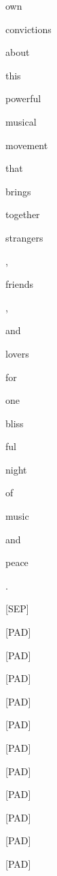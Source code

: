 \documentclass[varwidth=150mm]{standalone}
\begin{document}
\begin{CJK*}{UTF8}{gbsn}
{{{\colorbox{red!2.5239310264587402}{\strut own} \colorbox{red!10.412678718566895}{\strut convictions} \colorbox{red!2.299309730529785}{\strut about} \colorbox{red!8.074763298034668}{\strut this} \colorbox{red!3.294198513031006}{\strut powerful} \colorbox{red!11.1122407913208}{\strut musical} \colorbox{red!8.959418296813965}{\strut movement} \colorbox{red!4.8748297691345215}{\strut that} \colorbox{red!0.0}{\strut brings} \colorbox{red!1.7150049209594727}{\strut together} \colorbox{red!10.77143669128418}{\strut strangers} \colorbox{red!2.6435208320617676}{\strut ,} \colorbox{red!3.35581111907959}{\strut friends} \colorbox{red!0.0}{\strut ,} \colorbox{red!2.050785541534424}{\strut and} \colorbox{red!15.49782657623291}{\strut lovers} \colorbox{red!3.683424234390259}{\strut for} \colorbox{red!1.8308460712432861}{\strut one} \colorbox{red!10.97144889831543}{\strut bliss}\colorbox{red!1.8888214826583862}{\strut ful} \colorbox{red!1.782985806465149}{\strut night} \colorbox{red!1.332716941833496}{\strut of} \colorbox{red!5.4945387840271}{\strut music} \colorbox{red!2.7096283435821533}{\strut and} \colorbox{red!16.12168312072754}{\strut peace} \colorbox{red!3.8573176860809326}{\strut .} \colorbox{red!1.6319191455841064}{\strut [SEP]} \colorbox{red!0.0}{\strut [PAD]} \colorbox{red!0.0}{\strut [PAD]} \colorbox{red!0.0}{\strut [PAD]} \colorbox{red!0.0}{\strut [PAD]} \colorbox{red!0.0}{\strut [PAD]} \colorbox{red!0.0}{\strut [PAD]} \colorbox{red!0.0}{\strut [PAD]} \colorbox{red!0.0}{\strut [PAD]} \colorbox{red!0.0}{\strut [PAD]} \colorbox{red!0.0}{\strut [PAD]} \colorbox{red!0.0}{\strut [PAD]}
}}}
\end{CJK*}
\end{document}
